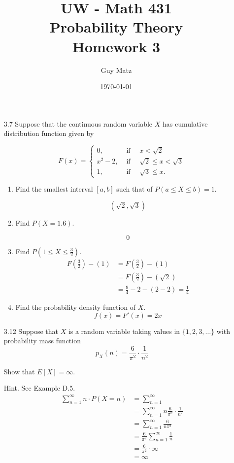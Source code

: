 \documentclass[10pt]{article}
\title{UW - Math 431 \\
Probability Theory \\
Homework 3}
\author{Guy Matz}
\date{\today}
\begin{document}
\maketitle

\begin{itemize}

    \item[3.7]  Suppose that the continuous random variable $X$ has cumulative distribution function given by

$$
F(x)= \begin{cases}0, & \text { if } \quad x<\sqrt{2} \\ x^{2}-2, & \text { if } \quad \sqrt{2} \leq x<\sqrt{3} \\ 1, & \text { if } \quad \sqrt{3} \leq x .\end{cases}
$$
    \begin{enumerate}
      \item  Find the smallest interval $[a, b]$ such that of $P(a \leq X \leq b)=1$.

        \[ ( \sqrt{2}, \sqrt{3} ) \]
      \item  Find $P(X=1.6)$.

          \[ 0 \]
      \item  Find $P\left(1 \leq X \leq \frac{3}{2}\right)$.
        \begin{align*}
          F(\frac{3}{2}) - (1) &= F(\frac{3}{2}) - (1) \\
                               &= F(\frac{3}{2}) - (\sqrt{2}) \\
                               &= \frac{9}{4} - 2 - (2 -2) = \frac{1}{4} 
        \end{align*}

      \item  Find the probability density function of $X$.
          \[ f(x) = F'(x) = 2x \]
    \end{enumerate}

\newpage
    \item[3.12]  Suppose that $X$ is a random variable taking values in $\{1,2,3, \ldots\}$ with probability mass function
      \[ p_{X}(n)=\frac{6}{\pi^{2}} \cdot \frac{1}{n^{2}} \]

Show that $E[X]=\infty$.

Hint. See Example D.5.
      \begin{align*}
        \sum^{\infty}_{n=1} n \cdot P(X=n) &= \sum^{\infty}_{n=1} \\
            &= \sum^{\infty}_{n=1} n \frac{6}{\pi^2} \cdot \frac{1}{n^2} \\
            &= \sum^{\infty}_{n=1} \frac{6}{n \pi^2} \\
            &= \frac{6}{\pi^2} \sum^{\infty}_{n=1} \frac{1}{n} \\
            &= \frac{6}{\pi^2} \cdot \infty \\
            &= \infty
      \end{align*}



\end{itemize}
\end{document}
